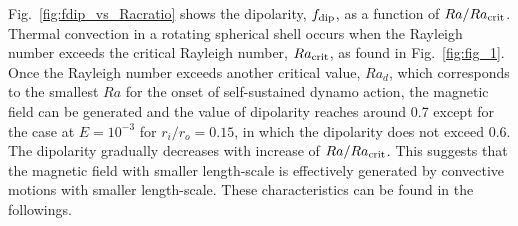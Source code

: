 %
%
%
%

{\color{red}
Fig.~\ref{fig:fdip_vs_Racratio} shows the dipolarity, $f_{\rm dip}$, as a function of $Ra / Ra_{\rm crit}$.
Thermal convection in a rotating spherical shell occurs when the Rayleigh number exceeds the critical Rayleigh number, $Ra_{\rm crit}$, as found in Fig.~\ref{fig:fig_1}.
Once the Rayleigh number exceeds another critical value, $Ra_d$, which corresponds to the smallest $Ra$ for the onset of self-sustained dynamo action, the magnetic field can be generated and the value of dipolarity reaches around 0.7 except for the case at $E = 10^{-3}$ for $r_i/r_o = 0.15$, in which the dipolarity does not exceed 0.6.
The dipolarity gradually decreases with increase of $Ra / Ra_{\rm crit}$.
This suggests that the magnetic field with smaller length-scale is effectively generated by convective motions with smaller length-scale.
These characteristics can be found in the followings.
}

% 





